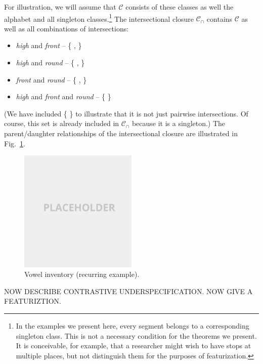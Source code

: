 \documentclass[11pt, oneside]{article}   	%
\begin{document}
\vspace{\baselineskip} \noindent For illustration, we will assume that $\mathcal C$ consists of these classes as well the alphabet and all singleton classes.\footnote{In the examples we present here, every segment belongs to a corresponding singleton class. This is not a necessary condition for the theorems we present. It is conceivable, for example, that a researcher might wish to have stops at multiple places, but not distinguish them for the purposes of featurization.} The intersectional closure $\mathcal C_\cap$ contains $\mathcal C$ as well as all combinations of intersections: \begin{itemize}
  \item \textit{high} and \textit{front} -- \{ ,  \}
  \item \textit{high} and \textit{round} -- \{ ,  \}
  \item \textit{front} and \textit{round} -- \{ , \textipa{\oe} \}
  \item \textit{high} and \textit{front} and \textit{round} -- \{  \}
  \end{itemize}
(We have included \{  \} to illustrate that it is not just pairwise intersections. Of course, this set is already included in $\mathcal C_\cap$ because it is a singleton.) The parent/daughter relationships of the intersectional closure are illustrated in Fig.~\ref{fig:vowelInventory}.

\begin{figure}[h]
  \centering
  \includegraphics[width=0.5\textwidth]{placeholder.png}
  \caption{Vowel inventory (recurring example).}
  \label{fig:vowelInventory}
\end{figure}

NOW DESCRIBE CONTRASTIVE UNDERSPECIFICATION. NOW GIVE A FEATURIZTION.
\end{document}
